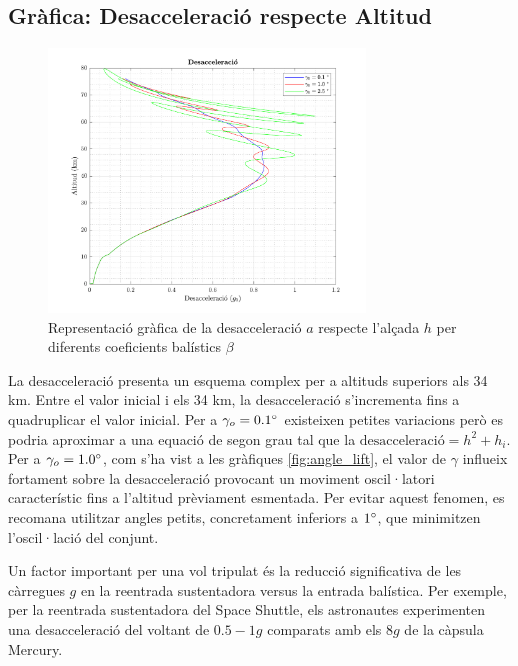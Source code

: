 \subsection{Gràfica: Desacceleració respecte Altitud}

\begin{figure}[ht]
    \centering
    \includegraphics[width=0.75\textwidth]{imagenes/02_lifting_graficas/desacceleracio.pdf}
    \caption{Representació gràfica de la desacceleració $a$ respecte l'alçada $h$ per diferents coeficients balístics $\beta$}
    \label{fig:desacceleracio_lift}
\end{figure}

La desacceleració presenta un esquema complex per a altituds superiors als 34 km. Entre el valor inicial i els 34 km, la desacceleració s'incrementa fins a quadruplicar el valor inicial. Per a $\gamma_o = 0.1 \mathrm{^{\circ}} $ existeixen petites variacions però es podria aproximar a una equació de segon grau tal que la $\text{desacceleració} = h^2+h_i$. Per a $\gamma_o = 1.0 \mathrm{^{\circ}} $, com s'ha vist a les gràfiques \ref{fig:angle_lift}, el valor de $\gamma$ influeix fortament sobre la desacceleració provocant un moviment oscil·latori característic fins a l'altitud prèviament esmentada. \newline
Per evitar aquest fenomen, es recomana utilitzar angles petits, concretament inferiors a $1 \mathrm{^{\circ}}$, que minimitzen l'oscil·lació del conjunt.

Un factor important per una vol tripulat és la reducció significativa de les càrregues $g$ en la reentrada sustentadora versus la entrada balística. Per exemple, per la reentrada sustentadora del Space Shuttle, els astronautes experimenten una desacceleració del voltant de $0.5 - 1 g$ comparats amb els $8 g$ de la càpsula Mercury.

